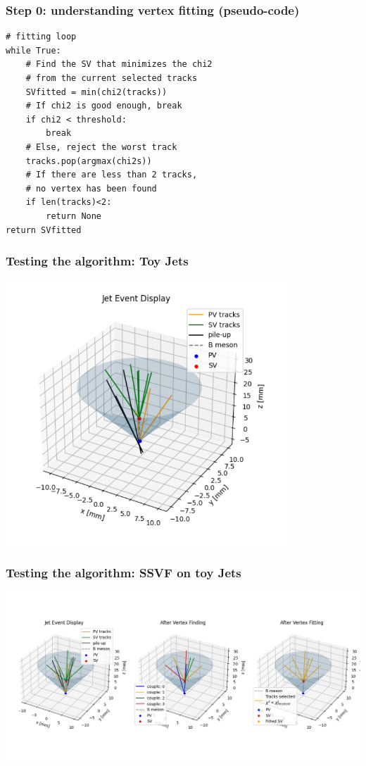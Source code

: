 \documentclass{beamer}
\begin{document}
\begin{frame}[fragile]
    \frametitle{Step 0: understanding vertex fitting (pseudo-code)}
    \begin{verbatim}
# fitting loop
while True:
    # Find the SV that minimizes the chi2
    # from the current selected tracks
    SVfitted = min(chi2(tracks))
    # If chi2 is good enough, break
    if chi2 < threshold:
        break
    # Else, reject the worst track
    tracks.pop(argmax(chi2s))
    # If there are less than 2 tracks,
    # no vertex has been found
    if len(tracks)<2:
        return None
return SVfitted
    \end{verbatim}
\end{frame}

\begin{frame}
    \frametitle{Testing the algorithm: Toy Jets}
    \begin{center}
        \includegraphics[width=0.8\textwidth]{../screenshots/eventDisplay.png}
    \end{center}
\end{frame}

\begin{frame}
    \frametitle{Testing the algorithm: SSVF on toy Jets}
    \begin{center}
        \includegraphics[width=\textwidth]{../screenshots/jetEventCone2.jpg}
    \end{center}
\end{frame}
\end{document}

